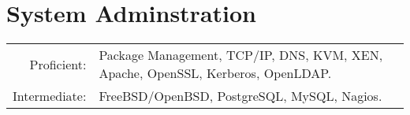 \documentclass[lettersize,10pt]{article}
\begin{document}
\section{System Adminstration}
\begin{tabular}{rl}
Proficient:& Package Management, TCP/IP, DNS, KVM, XEN, Apache, OpenSSL, Kerberos, OpenLDAP.\\
Intermediate:& FreeBSD/OpenBSD, PostgreSQL, MySQL, Nagios.\\
\end{tabular}


\end{document}
